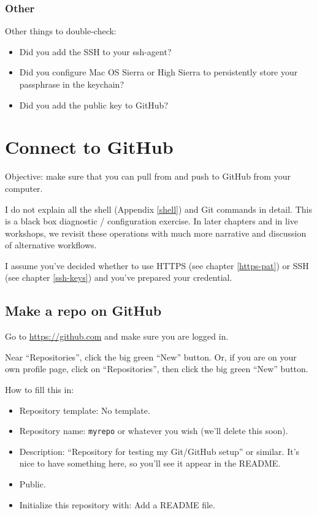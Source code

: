 \documentclass[
]{book}
\providecommand{\tightlist}{%
  \setlength{\itemsep}{0pt}\setlength{\parskip}{0pt}}
\begin{document}
\subsection{Other}\label{other}

Other things to double-check:

\begin{itemize}
\tightlist
\item
  Did you add the SSH to your ssh-agent?
\item
  Did you configure Mac OS Sierra or High Sierra to persistently store your passphrase in the keychain?
\item
  Did you add the public key to GitHub?
\end{itemize}

\chapter{Connect to GitHub}\label{push-pull-github}

Objective: make sure that you can pull from and push to GitHub from your computer.

I do not explain all the shell (Appendix \ref{shell}) and Git commands in detail.
This is a black box diagnostic / configuration exercise.
In later chapters and in live workshops, we revisit these operations with much more narrative and discussion of alternative workflows.

I assume you've decided whether to use HTTPS (see chapter \ref{https-pat}) or SSH (see chapter \ref{ssh-keys}) and you've prepared your credential.

\section{Make a repo on GitHub}\label{make-a-repo-on-github}

Go to \url{https://github.com} and make sure you are logged in.

Near ``Repositories'', click the big green ``New'' button.
Or, if you are on your own profile page, click on ``Repositories'', then click the big green ``New'' button.

How to fill this in:

\begin{itemize}
\tightlist
\item
  Repository template: No template.
\item
  Repository name: \texttt{myrepo} or whatever you wish (we'll delete this soon).
\item
  Description: ``Repository for testing my Git/GitHub setup'' or similar. It's nice to have something here, so you'll see it appear in the README.
\item
  Public.
\item
  Initialize this repository with: Add a README file.
\end{itemize}
\end{document}
